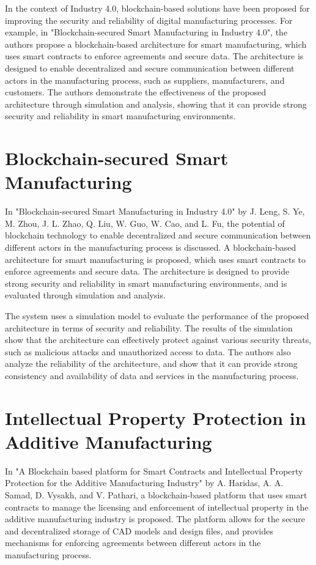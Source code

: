 \documentclass[10pt,a4paper]{report}
\begin{document}
\large\justify In the context of Industry 4.0, blockchain-based solutions have been proposed for improving the security and reliability of digital manufacturing processes. For example, in "Blockchain-secured Smart Manufacturing in Industry 4.0", the authors propose a blockchain-based architecture for smart manufacturing, which uses smart contracts to enforce agreements and secure data. The architecture is designed to enable decentralized and secure communication between different actors in the manufacturing process, such as suppliers, manufacturers, and customers. The authors demonstrate the effectiveness of the proposed architecture through simulation and analysis, showing that it can provide strong security and reliability in smart manufacturing environments.

\section{Blockchain-secured Smart Manufacturing}
\large\justify In "Blockchain-secured Smart Manufacturing in Industry 4.0" by J. Leng, S. Ye, M. Zhou, J. L. Zhao, Q. Liu, W. Guo, W. Cao, and L. Fu, the potential of blockchain technology to enable decentralized and secure communication between different actors in the manufacturing process is discussed. A blockchain-based architecture for smart manufacturing is proposed, which uses smart contracts to enforce agreements and secure data. The architecture is designed to provide strong security and reliability in smart manufacturing environments, and is evaluated through simulation and analysis.

\large\justify The system uses a simulation model to evaluate the performance of the proposed architecture in terms of security and reliability. The results of the simulation show that the architecture can effectively protect against various security threats, such as malicious attacks and unauthorized access to data. The authors also analyze the reliability of the architecture, and show that it can provide strong consistency and availability of data and services in the manufacturing process.

\section{Intellectual Property Protection in Additive Manufacturing}
\large\justify In "A Blockchain based platform for Smart Contracts and Intellectual Property Protection for the Additive Manufacturing Industry" by A. Haridas, A. A. Samad, D. Vysakh, and V. Pathari, a blockchain-based platform that uses smart contracts to manage the licensing and enforcement of intellectual property in the additive manufacturing industry is proposed. The platform allows for the secure and decentralized storage of CAD models and design files, and provides mechanisms for enforcing agreements between different actors in the manufacturing process.
\end{document}
